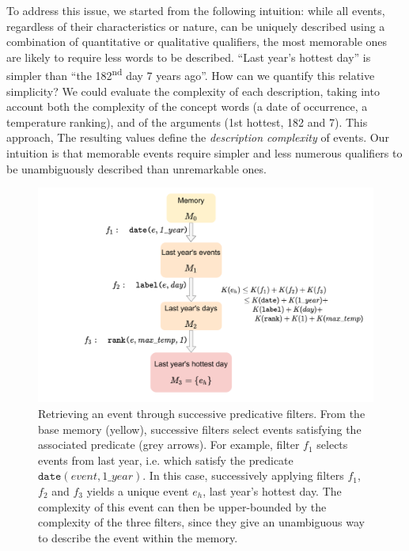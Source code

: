 \documentclass[entropy,article,submit,moreauthors,pdftex]{Definitions/mdpi}
\begin{document}
To address this issue, we started from the following intuition: while all
events, regardless of their characteristics or nature, can be uniquely
described using a combination of quantitative or qualitative qualifiers, the most memorable ones are
likely to require less words to be described. ``Last year's hottest day'' is simpler than ``the 182\textsuperscript{nd} day 7 years ago''. How can we quantify this relative simplicity? We could evaluate the complexity of each
description, taking into account both the complexity of the concept words (a date
of occurrence, a temperature ranking), and of the arguments (1st hottest,
182 and 7). This approach, The resulting values define the  \emph{description complexity}
of events. Our intuition is that memorable events require simpler and less numerous qualifiers to be
unambiguously described than unremarkable ones.


\begin{figure}[ht]
    \centering
    \includegraphics[width=\linewidth]{figures/filters}
    \caption{Retrieving an event through successive predicative
        filters. From the base memory (yellow), successive filters select events satisfying the associated predicate (grey arrows). For example,
        filter $f_1$ selects events from last year, i.e. which satisfy the
        predicate $\mathtt{date}(event, 1\_year)$. In this case, successively
        applying filters $f_1$, $f_2$ and $f_3$ yields a unique event $e_h$, last
        year's hottest day. The complexity of this event can then be upper-bounded
        by the complexity of the three filters, since they give an unambiguous way
        to describe the event within the memory.}
    \label{fig:filters}
\end{figure}
\end{document}
